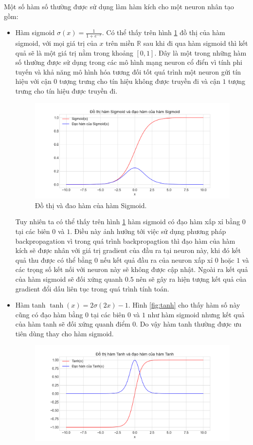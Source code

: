 Một số hàm số thường được sử dụng làm hàm kích cho một neuron nhân tạo gồm:
\begin{itemize}
	\item Hàm sigmoid $\sigma(x) = \frac{1}{1+e^{-x}}$. Có thể thấy trên hình \ref{fig:sigmoid} đồ thị của hàm sigmoid, với mọi giá trị của $x$ trên miền $\mathbb{R}$ sau khi đi qua hàm sigmoid thì kết quả sẽ là một giá trị nằm trong khoảng $[0,1]$. Đây là một trong những hàm số thường được sử dụng trong các mô hình mạng neuron cổ điển vì tính phi tuyến và khả năng mô hình hóa tương đối tốt quá trình một neuron gửi tín hiệu với cận $0$ tượng trưng cho tín hiệu không được truyền đi và cận $1$ tượng trưng cho tín hiệu được truyền đi.
	\begin{figure}[ht!]
		\centerline{\includegraphics[scale=0.4]{images/sigmoid.png}}
  		\caption{Đồ thị và đao hàm của hàm Sigmoid.}
  		\label{fig:sigmoid}
	\end{figure}
	Tuy nhiên ta có thể thấy trên hình \ref{fig:sigmoid} hàm sigmoid có đạo hàm xấp xỉ bằng $0$ tại các biên $0$ và $1$. Điều này ảnh hưởng tới việc sử dụng phương pháp backpropagation vì trong quá trình backpropagtion thì đạo hàm của hàm kích sẽ được nhân với giá trị gradient của đầu ra tại neuron này, khi đó kết quả thu được có thể bằng $0$ nếu kết quả đầu ra của neuron xấp xỉ $0$ hoặc $1$ và các trọng số kết nối với neuron này sẽ không được cập nhật. Ngoài ra kết quả của hàm sigmoid sẽ đối xứng quanh $0.5$ nên sẽ gây ra hiện tượng kết quả của gradient đổi dấu liên tục trong quá trình tính toán.
	\item Hàm tanh $\tanh(x)=2\sigma(2x)-1$. Hình \ref{fig:tanh} cho thấy hàm số này cũng có đạo hàm bằng $0$ tại các biên $0$ và $1$ như hàm sigmoid nhưng kết quả của hàm tanh sẽ đối xứng quanh điểm $0$. Do vậy hàm tanh thường được ưu tiên dùng thay cho hàm sigmoid.
	\begin{figure}[ht!]
		\centerline{\includegraphics[scale=0.4]{images/tanh.png}}

\end{figure}
\end{itemize}
